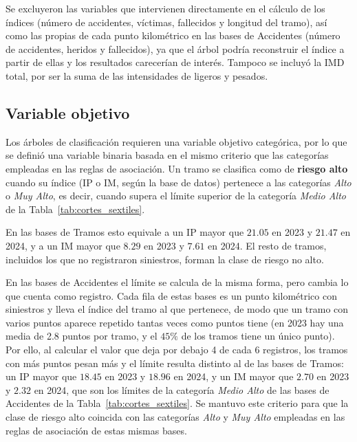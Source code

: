 \documentclass[twoside,a4paper,12pt,onecolumn,openany]{book}
\begin{document}
\vspace{0.5cm}
 
Se excluyeron las variables que intervienen directamente en el cálculo de los índices (número de accidentes, víctimas, fallecidos y longitud del tramo), así como las propias de cada punto kilométrico en las bases de Accidentes (número de accidentes, heridos y fallecidos), ya que el árbol podría reconstruir el índice a partir de ellas y los resultados carecerían de interés. Tampoco se incluyó la IMD total, por ser la suma de las intensidades de ligeros y pesados.
 
\subsection{Variable objetivo}
 
Los árboles de clasificación requieren una variable objetivo categórica, por lo que se definió una variable binaria basada en el mismo criterio que las categorías empleadas en las reglas de asociación. Un tramo se clasifica como de \textbf{riesgo alto} cuando su índice (IP o IM, según la base de datos) pertenece a las categorías \textit{Alto} o \textit{Muy Alto}, es decir, cuando supera el límite superior de la categoría \textit{Medio Alto} de la Tabla~\ref{tab:cortes_sextiles}.
 
\vspace{0.5cm}
 
En las bases de Tramos esto equivale a un IP mayor que $21.05$ en 2023 y $21.47$ en 2024, y a un IM mayor que $8.29$ en 2023 y $7.61$ en 2024. El resto de tramos, incluidos los que no registraron siniestros, forman la clase de riesgo no alto.
 
\vspace{0.5cm}
 
En las bases de Accidentes el límite se calcula de la misma forma, pero cambia lo que cuenta como registro. Cada fila de estas bases es un punto kilométrico con siniestros y lleva el índice del tramo al que pertenece, de modo que un tramo con varios puntos aparece repetido tantas veces como puntos tiene (en 2023 hay una media de 2.8 puntos por tramo, y el $45\%$ de los tramos tiene un único punto). Por ello, al calcular el valor que deja por debajo 4 de cada 6 registros, los tramos con más puntos pesan más y el límite resulta distinto al de las bases de Tramos: un IP mayor que $18.45$ en 2023 y $18.96$ en 2024, y un IM mayor que $2.70$ en 2023 y $2.32$ en 2024, que son los límites de la categoría \textit{Medio Alto} de las bases de Accidentes de la Tabla~\ref{tab:cortes_sextiles}. Se mantuvo este criterio para que la clase de riesgo alto coincida con las categorías \textit{Alto} y \textit{Muy Alto} empleadas en las reglas de asociación de estas mismas bases.
 
\end{document}
